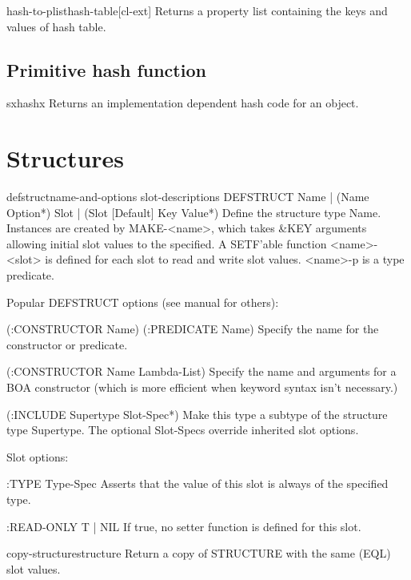 \documentclass[10pt,english]{book}
\begin{document}
\begin{function}{hash-to-plist}{hash-table}[cl-ext]
  Returns a property list containing the keys and values of hash
  table.
\end{function}

\section{Primitive hash function}
\label{sec:prim-hash-funct}

\begin{function}{sxhash}{x}
  Returns an implementation dependent hash code for an object.
\end{function}

\chapter{Structures}

\begin{macro}{defstruct}{name-and-options \rest slot-descriptions}
  DEFSTRUCT {Name | (Name Option*)} {Slot | (Slot [Default] {Key Value}*)}
   Define the structure type Name. Instances are created by MAKE-<name>,
   which takes \&KEY arguments allowing initial slot values to the specified.
   A SETF'able function <name>-<slot> is defined for each slot to read and
   write slot values. <name>-p is a type predicate.

   Popular DEFSTRUCT options (see manual for others):

   (:CONSTRUCTOR Name)
   (:PREDICATE Name)
       Specify the name for the constructor or predicate.

   (:CONSTRUCTOR Name Lambda-List)
       Specify the name and arguments for a BOA constructor
       (which is more efficient when keyword syntax isn't necessary.)

   (:INCLUDE Supertype Slot-Spec*)
       Make this type a subtype of the structure type Supertype. The optional
       Slot-Specs override inherited slot options.

   Slot options:

   :TYPE Type-Spec
       Asserts that the value of this slot is always of the specified type.

   :READ-ONLY {T | NIL}
       If true, no setter function is defined for this slot.
\end{macro}

\begin{function}{copy-structure}{structure}
  Return a copy of STRUCTURE with the same (EQL) slot values.
\end{function}
\end{document}
